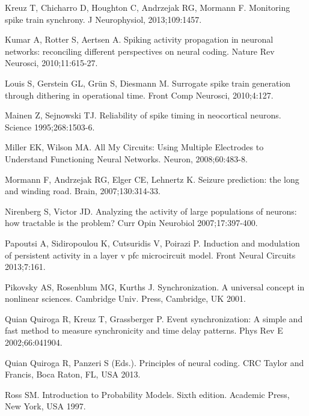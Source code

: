 \documentclass[10pt,twocolumn]{elsart5p}
\begin{document}
\begin{thebibliography}{25}
Kreuz T, Chicharro D, Houghton C, Andrzejak RG, Mormann F. Monitoring spike train synchrony. J Neurophysiol, 2013;109:1457.

Kumar A, Rotter S, Aertsen A. Spiking activity propagation in neuronal networks: reconciling different perspectives on neural coding. Nature Rev Neurosci, 2010;11:615-27.

Louis S, Gerstein GL, Gr{\"u}n S, Diesmann M. Surrogate spike train generation through dithering in operational time. Front Comp Neurosci, 2010;4:127.

Mainen Z, Sejnowski TJ. Reliability of spike timing in neocortical neurons. Science 1995;268:1503-6.

Miller EK, Wilson MA. All My Circuits: Using Multiple Electrodes to Understand Functioning Neural Networks. Neuron, 2008;60:483-8.

Mormann F, Andrzejak RG, Elger CE, Lehnertz K. Seizure prediction: the long and winding road. Brain, 2007;130:314-33.

Nirenberg S, Victor JD. Analyzing the activity of large populations of neurons: how tractable is the problem? Curr Opin Neurobiol 2007;17:397-400.

Papoutsi A, Sidiropoulou K, Cutsuridis V, Poirazi P. Induction and modulation of persistent activity in a layer v pfc microcircuit model. Front Neural Circuits 2013;7:161.

Pikovsky AS, Rosenblum MG, Kurths J. Synchronization. A universal concept in nonlinear sciences. Cambridge Univ. Press, Cambridge, UK 2001.

{Quian Quiroga} R, Kreuz T, Grassberger P. Event synchronization: \textsc{A} simple and fast method to measure synchronicity and time delay patterns. Phys Rev E 2002;66:041904.

{Quian Quiroga} R, Panzeri S (Eds.). Principles of neural coding. CRC Taylor and Francis, Boca Raton, FL, USA 2013.

Ross SM. Introduction to Probability Models. Sixth edition. Academic Press, New York, USA 1997.


\end{thebibliography}
\end{document}
